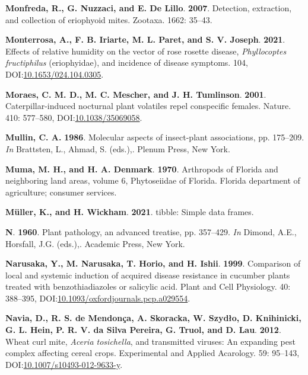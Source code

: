 \documentclass[12pt,final,CPage]{ufthesis}
\newlength{\cslhangindent}
\newenvironment{CSLReferences}[2] %
{%
	\setlength{\parindent}{0pt}
	\ifodd #1 \everypar{\setlength{\hangindent}{\cslhangindent}}\ignorespaces\fi
	\ifnum #2 > 0
	\setlength{\parskip}{#2\baselineskip}
	\fi
}%
{}
\begin{document}
{\begin{CSLReferences}{1}{0}
  \leavevmode{}%
  \textbf{Monfreda, R., G. Nuzzaci, and E. De Lillo}. \textbf{2007}. Detection, extraction, and collection of eriophyoid mites. Zootaxa. 1662: 35--43.

  \leavevmode{}%
  \textbf{Monterrosa, A., F. B. Iriarte, M. L. Paret, and S. V. Joseph}. \textbf{2021}. Effects of relative humidity on the vector of rose rosette disease, {\emph{Phyllocoptes fructiphilus}} (eriophyidae), and incidence of disease symptoms. 104, DOI:\href{https://doi.org/10.1653/024.104.0305}{10.1653/024.104.0305}.

  \leavevmode{}%
  \textbf{Moraes, C. M. D., M. C. Mescher, and J. H. Tumlinson}. \textbf{2001}. Caterpillar-induced nocturnal plant volatiles repel conspecific females. Nature. 410: 577--580, DOI:\href{https://doi.org/10.1038/35069058}{10.1038/35069058}.

  \leavevmode{}%
  \textbf{Mullin, C. A.} \textbf{1986}. Molecular aspects of insect-plant associations, pp. 175--209. \emph{In} Brattsten, L., Ahmad, S. (eds.),. Plenum Press, New York.

  \leavevmode{}%
  \textbf{Muma, M. H., and H. A. Denmark}. \textbf{1970}. Arthropods of {Florida} and neighboring land areas, volume 6, {Phytoseiidae} of {Florida}. Florida department of agriculture; consumer services.

  \leavevmode{}%
  \textbf{Müller, K., and H. Wickham}. \textbf{2021}. {tibble}: Simple data frames.

  \leavevmode{}%
  \textbf{N}. \textbf{1960}. Plant pathology, an advanced treatise, pp. 357--429. \emph{In} Dimond, A.E., Horsfall, J.G. (eds.),. Academic Press, New York.

  \leavevmode{}%
  \textbf{Narusaka, Y., M. Narusaka, T. Horio, and H. Ishii}. \textbf{1999}. Comparison of local and systemic induction of acquired disease resistance in cucumber plants treated with benzothiadiazoles or salicylic acid. Plant and Cell Physiology. 40: 388--395, DOI:\href{https://doi.org/10.1093/oxfordjournals.pcp.a029554}{10.1093/oxfordjournals.pcp.a029554}.

  \leavevmode{}%
  \textbf{Navia, D., R. S. de Mendonça, A. Skoracka, W. Szydło, D. Knihinicki, G. L. Hein, P. R. V. da Silva Pereira, G. Truol, and D. Lau}. \textbf{2012}. {Wheat curl mite}, {\emph{Aceria tosichella}}, and transmitted viruses: An expanding pest complex affecting cereal crops. Experimental and Applied Acarology. 59: 95--143, DOI:\href{https://doi.org/10.1007/s10493-012-9633-y}{10.1007/s10493-012-9633-y}.


\end{CSLReferences}}
\end{document}
